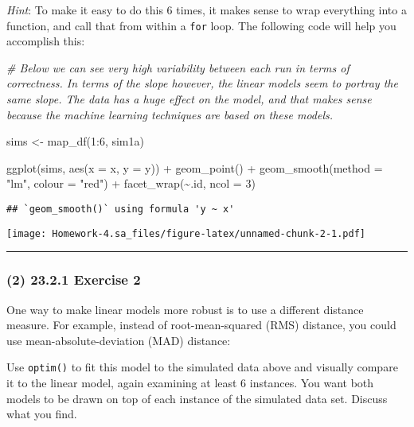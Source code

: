 \documentclass[
]{article}
\newenvironment{Shaded}{\begin{snugshade}}{\end{snugshade}}
\newcommand{\AttributeTok}[1]{\textcolor[rgb]{0.77,0.63,0.00}{#1}}
\newcommand{\CommentTok}[1]{\textcolor[rgb]{0.56,0.35,0.01}{\textit{#1}}}
\newcommand{\DecValTok}[1]{\textcolor[rgb]{0.00,0.00,0.81}{#1}}
\newcommand{\FunctionTok}[1]{\textcolor[rgb]{0.00,0.00,0.00}{#1}}
\newcommand{\NormalTok}[1]{#1}
\newcommand{\OtherTok}[1]{\textcolor[rgb]{0.56,0.35,0.01}{#1}}
\newcommand{\SpecialCharTok}[1]{\textcolor[rgb]{0.00,0.00,0.00}{#1}}
\newcommand{\StringTok}[1]{\textcolor[rgb]{0.31,0.60,0.02}{#1}}
\begin{document}
\emph{Hint}: To make it easy to do this 6 times, it makes sense to wrap
everything into a function, and call that from within a \texttt{for}
loop. The following code will help you accomplish this:

\begin{Shaded}
\begin{Highlighting}[]
\CommentTok{\# Below we can see very high variability between each run in terms of correctness. In terms of the slope however, the linear models seem to portray the same slope. The data has a huge effect on the model, and that makes sense because the machine learning techniques are based on these models.}

\NormalTok{sims }\OtherTok{\textless{}{-}} \FunctionTok{map\_df}\NormalTok{(}\DecValTok{1}\SpecialCharTok{:}\DecValTok{6}\NormalTok{, sim1a)}

\FunctionTok{ggplot}\NormalTok{(sims, }\FunctionTok{aes}\NormalTok{(}\AttributeTok{x =}\NormalTok{ x, }\AttributeTok{y =}\NormalTok{ y)) }\SpecialCharTok{+}
  \FunctionTok{geom\_point}\NormalTok{() }\SpecialCharTok{+}
  \FunctionTok{geom\_smooth}\NormalTok{(}\AttributeTok{method =} \StringTok{"lm"}\NormalTok{, }\AttributeTok{colour =} \StringTok{"red"}\NormalTok{) }\SpecialCharTok{+}
  \FunctionTok{facet\_wrap}\NormalTok{(}\SpecialCharTok{\textasciitilde{}}\NormalTok{.id, }\AttributeTok{ncol =} \DecValTok{3}\NormalTok{)}
\end{Highlighting}
\end{Shaded}

\begin{verbatim}
## `geom_smooth()` using formula 'y ~ x'
\end{verbatim}

\texttt{[image: Homework-4.sa\_files/figure-latex/unnamed-chunk-2-1.pdf]}

\begin{center}\rule{0.5\linewidth}{0.5pt}\end{center}

\hypertarget{exercise-2}{%
\subsubsection{(2) 23.2.1 Exercise 2}\label{exercise-2}}

One way to make linear models more robust is to use a different distance
measure. For example, instead of root-mean-squared (RMS) distance, you
could use mean-absolute-deviation (MAD) distance:

Use \texttt{optim()} to fit this model to the simulated data above and
visually compare it to the linear model, again examining at least 6
instances. You want both models to be drawn on top of each instance of
the simulated data set. Discuss what you find.
\end{document}
